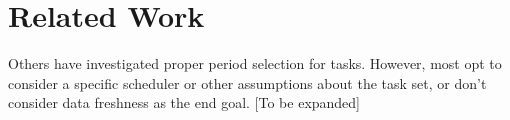 \section{Related Work}
Others have investigated proper period selection for tasks. However, most opt to consider a specific scheduler or other assumptions about the task set, or don't consider data freshness as the end goal. [To be expanded]